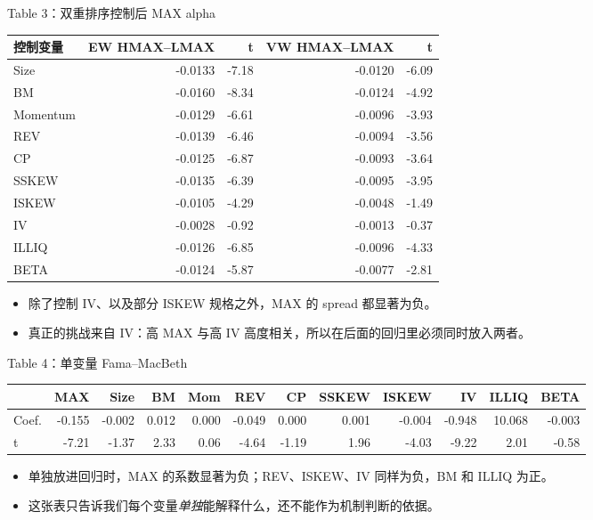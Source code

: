 \documentclass[aspectratio=169,10pt]{beamer}
\newcommand{\tighttable}{\scriptsize\setlength{\tabcolsep}{3pt}\renewcommand{\arraystretch}{1.12}}
\newcommand{\tinytab}{\tiny\setlength{\tabcolsep}{2.2pt}\renewcommand{\arraystretch}{1.08}}
\begin{document}
\begin{frame}{Table 3：双重排序控制后 MAX alpha}
	\tinytab
	\begin{tabular}{lrrrr}
		\toprule
		控制变量 & EW HMAX--LMAX & t & VW HMAX--LMAX & t \\
		\midrule
		Size & -0.0133 & -7.18 & -0.0120 & -6.09\\
		BM & -0.0160 & -8.34 & -0.0124 & -4.92\\
		Momentum & -0.0129 & -6.61 & -0.0096 & -3.93\\
		REV & -0.0139 & -6.46 & -0.0094 & -3.56\\
		CP & -0.0125 & -6.87 & -0.0093 & -3.64\\
		SSKEW & -0.0135 & -6.39 & -0.0095 & -3.95\\
		ISKEW & -0.0105 & -4.29 & -0.0048 & -1.49\\
		IV & -0.0028 & -0.92 & -0.0013 & -0.37\\
		ILLIQ & -0.0126 & -6.85 & -0.0096 & -4.33\\
		BETA & -0.0124 & -5.87 & -0.0077 & -2.81\\
		\bottomrule
	\end{tabular}
	\vspace{4pt}
	\begin{itemize}
		\item 除了控制 IV、以及部分 ISKEW 规格之外，MAX 的 spread 都显著为负。
		\item 真正的挑战来自 IV：高 MAX 与高 IV 高度相关，所以在后面的回归里必须同时放入两者。
	\end{itemize}
\end{frame}

\begin{frame}{Table 4：单变量 Fama--MacBeth}
	\tighttable
	\begin{tabular}{lrrrrrrrrrrr}
		\toprule
		& MAX & Size & BM & Mom & REV & CP & SSKEW & ISKEW & IV & ILLIQ & BETA\\
		\midrule
		Coef. & -0.155 & -0.002 & 0.012 & 0.000 & -0.049 & 0.000 & 0.001 & -0.004 & -0.948 & 10.068 & -0.003\\
		t & -7.21 & -1.37 & 2.33 & 0.06 & -4.64 & -1.19 & 1.96 & -4.03 & -9.22 & 2.01 & -0.58\\
		\bottomrule
	\end{tabular}
	\vspace{6pt}
	\begin{itemize}
		\item 单独放进回归时，MAX 的系数显著为负；REV、ISKEW、IV 同样为负，BM 和 ILLIQ 为正。
		\item 这张表只告诉我们每个变量\emph{单独}能解释什么，还不能作为机制判断的依据。
	\end{itemize}
\end{frame}
\end{document}
